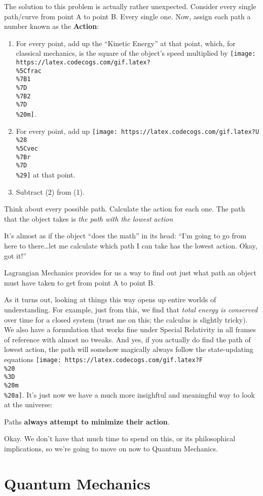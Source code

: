 \documentclass[]{article}
\begin{document}
The solution to this problem is actually rather unexpected. Consider every
single path/curve from point A to point B. Every single one. Now, assign each
path a number known as the \textbf{Action}:

\begin{enumerate}
\def\labelenumi{\arabic{enumi}.}
\tightlist
\item
  For every point, add up the ``Kinetic Energy'' at that point, which, for
  classical mechanics, is the square of the object's speed multiplied by
  \texttt{[image: https://latex.codecogs.com/gif.latex?\\\%5Cfrac\\\%7B1\\\%7D\\\%7B2\\\%7D\\\%20m]}.
\item
  For every point, add up
  \texttt{[image: https://latex.codecogs.com/gif.latex?U\\\%28\\\%5Cvec\\\%7Br\\\%7D\\\%29]}
  at that point.
\item
  Subtract (2) from (1).
\end{enumerate}

Think about every possible path. Calculate the action for each one. The path
that the object takes is \emph{the path with the lowest action}

It's almost as if the object ``does the math'' in its head: ``I'm going to go
from here to there\ldots{}let me calculate which path I can take has the lowest
action. Okay, got it!''

Lagrangian Mechanics provides for us a way to find out just what path an object
must have taken to get from point A to point B.

As it turns out, looking at things this way opens up entire worlds of
understanding. For example, just from this, we find that \emph{total energy is
conserved} over time for a closed system (trust me on this; the calculus is
slightly tricky). We also have a formulation that works fine under Special
Relativity in all frames of reference with almost no tweaks. And yes, if you
actually do find the path of lowest action, the path will somehow magically
always follow the state-updating equations
\texttt{[image: https://latex.codecogs.com/gif.latex?F\\\%20\\\%3D\\\%20m\\\%20a]}. It's
just now we have a much more insighftul and meaningful way to look at the
universe:

Paths \textbf{always attempt to minimize their action}.

Okay. We don't have that much time to spend on this, or its philosophical
implications, so we're going to move on now to Quantum Mechanics.

\section{Quantum Mechanics}\label{quantum-mechanics}
\end{document}
